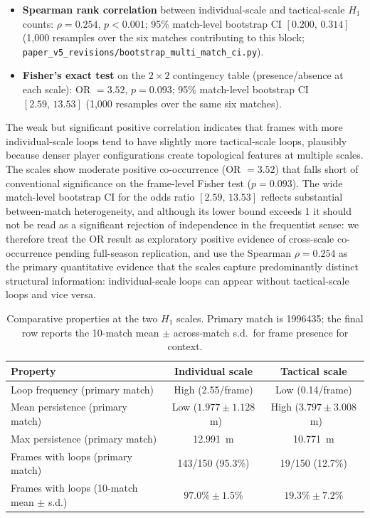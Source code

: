 \begin{itemize}
  \item \textbf{Spearman rank correlation} between individual-scale and tactical-scale \(H_1\) counts: \(\rho=0.254\), \(p<0.001\); 95\% match-level bootstrap CI \([0.200,\,0.314]\) (1{,}000 resamples over the six matches contributing to this block; \texttt{paper\_v5\_revisions/bootstrap\_multi\_match\_ci.py}).
  \item \textbf{Fisher's exact test} on the \(2\times2\) contingency table (presence/absence at each scale): OR \(=3.52\), \(p=0.093\); 95\% match-level bootstrap CI \([2.59,\,13.53]\) (1{,}000 resamples over the same six matches).
\end{itemize}

The weak but significant positive correlation indicates that frames with more individual-scale loops tend to have slightly more tactical-scale loops, plausibly because denser player configurations create topological features at multiple scales. The scales show moderate positive co-occurrence (OR \(=3.52\)) that falls short of conventional significance on the frame-level Fisher test (\(p=0.093\)). The wide match-level bootstrap CI for the odds ratio \([2.59,\,13.53]\) reflects substantial between-match heterogeneity, and although its lower bound exceeds 1 it should not be read as a significant rejection of independence in the frequentist sense: we therefore treat the OR result as exploratory positive evidence of cross-scale co-occurrence pending full-season replication, and use the Spearman \(\rho=0.254\) as the primary quantitative evidence that the scales capture predominantly distinct structural information: individual-scale loops can appear without tactical-scale loops and vice versa.

\begin{table}[H]
  \centering
  \caption{Comparative properties at the two \(H_1\) scales. Primary match is 1996435; the final row reports the 10-match mean \(\pm\) across-match s.d.\ for frame presence for context.}
  \label{tab:complement}
  \begin{tabular}{@{}lcc@{}}
      \toprule
      Property & Individual scale & Tactical scale \\
      \midrule
      Loop frequency (primary match)      & High (2.55/frame)          & Low (0.14/frame) \\
      Mean persistence (primary match)    & Low (\(1.977\pm1.128\)~m)  & High (\(3.797\pm3.008\)~m) \\
      Max persistence (primary match)     & 12.991~m                   & 10.771~m \\
      Frames with loops (primary match)   & 143/150 (95.3\%)           & 19/150 (12.7\%) \\
      Frames with loops (10-match mean $\pm$ s.d.) & \(97.0\%\pm1.5\%\) & \(19.3\%\pm7.2\%\) \\
      \bottomrule
  \end{tabular}
\end{table}

